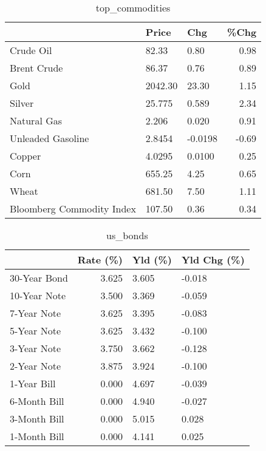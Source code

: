 \documentclass{article}%
\begin{document}
\begin{table}[htbp]%
\caption{top\_commodities}%
\centering%
\begin{adjustbox}{width=1\textwidth}%
\begin{tabular}{lllr}
\toprule
                          &   Price &     Chg &  \%Chg \\
\midrule
               Crude Oil  &   82.33 &    0.80 &  0.98 \\
             Brent Crude  &   86.37 &    0.76 &  0.89 \\
                    Gold  & 2042.30 &   23.30 &  1.15 \\
                  Silver  &  25.775 &   0.589 &  2.34 \\
             Natural Gas  &   2.206 &   0.020 &  0.91 \\
       Unleaded Gasoline  &  2.8454 & -0.0198 & -0.69 \\
                  Copper  &  4.0295 &  0.0100 &  0.25 \\
                    Corn  &  655.25 &    4.25 &  0.65 \\
                   Wheat  &  681.50 &    7.50 &  1.11 \\
Bloomberg Commodity Index &  107.50 &    0.36 &  0.34 \\
\bottomrule
\end{tabular}
%
\end{adjustbox}%
\end{table}

%


\begin{table}[htbp]%
\caption{us\_bonds}%
\centering%
\begin{adjustbox}{width=1\textwidth}%
\begin{tabular}{lrll}
\toprule
             &  Rate (\%) & Yld (\%) & Yld Chg (\%) \\
\midrule
30-Year Bond &     3.625 &   3.605 &      -0.018 \\
10-Year Note &     3.500 &   3.369 &      -0.059 \\
 7-Year Note &     3.625 &   3.395 &      -0.083 \\
 5-Year Note &     3.625 &   3.432 &      -0.100 \\
 3-Year Note &     3.750 &   3.662 &      -0.128 \\
 2-Year Note &     3.875 &   3.924 &      -0.100 \\
 1-Year Bill &     0.000 &   4.697 &      -0.039 \\
6-Month Bill &     0.000 &   4.940 &      -0.027 \\
3-Month Bill &     0.000 &   5.015 &       0.028 \\
1-Month Bill &     0.000 &   4.141 &       0.025 \\
\bottomrule
\end{tabular}
%
\end{adjustbox}%
\end{table}
\end{document}
